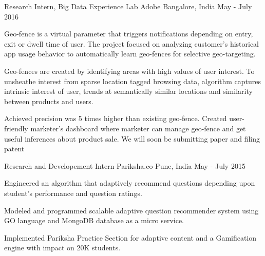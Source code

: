 

\begin{cventries}

  \cventry
    {Research Intern, Big Data Experience Lab} %
    {Adobe} %
    {Bangalore, India} %
    {May - July 2016} %
    {
      \begin{cvitems} %
        \item {Geo-fence is a virtual parameter that triggers notifications depending on entry, exit or dwell time of user. The project focused on analyzing customer’s historical app usage behavior to automatically learn geo-fences for selective geo-targeting.}
        \item {Geo-fences are created by identifying areas with high values of user interest. To unsheathe interest from sparse location tagged browsing data, algorithm captures intrinsic interest of user, trends at semantically similar locations and similarity between products and users.}
        \item {Achieved precision was 5 times higher than existing geo-fence. Created user-friendly marketer’s dashboard where marketer can manage geo-fence and get useful inferences about product sale. We will soon be submitting paper and filing patent}
      \end{cvitems}
    }

  \cventry
    {Research and Developement Intern} %
    {Pariksha.co} %
    {Pune, India} %
    {May - July 2015} %
    {
      \begin{cvitems} 
      	\item {Engineered an algorithm that adaptively recommend questions depending upon student’s performance and question ratings.}
      	\item {Modeled and programmed scalable adaptive question recommender system using GO language and MongoDB database as a micro service.}
      	\item {Implemented Pariksha Practice Section for adaptive content and a Gamification engine with impact on 20K students.}
      \end{cvitems}
    }
\end{cventries}
